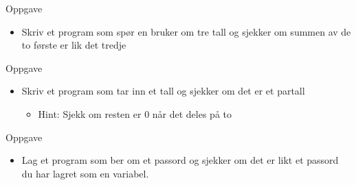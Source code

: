 \documentclass[screen, aspectratio=169]{beamer}
\begin{document}
\begin{frame}{Oppgave}
	\begin{itemize}
		\item Skriv et program som spør en bruker om tre tall og sjekker om summen av de to første er lik det tredje
	\end{itemize}
\end{frame}

\begin{frame}{Oppgave}
	\begin{itemize}
		\item Skriv et program som tar inn et tall og sjekker om det er et partall
		\begin{itemize}
			\item<2-> Hint: Sjekk om resten er 0 når det deles på to
		\end{itemize}
	\end{itemize}
\end{frame}

\begin{frame}{Oppgave}
	\begin{itemize}
		\item Lag et program som ber om et passord og sjekker om det er likt et passord du har lagret som en variabel.
	\end{itemize}
\end{frame}
\end{document}
